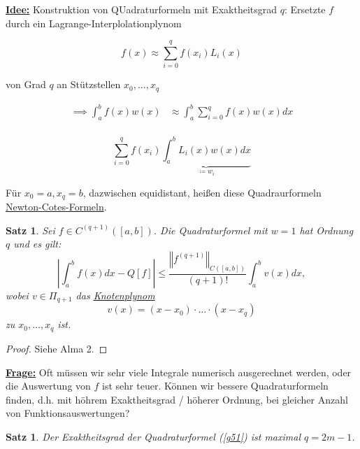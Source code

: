 \documentclass{book}
\newtheorem{theorem}[algorithm]{Satz}
\begin{document}
            \underline{\textbf{Idee:}} Konstruktion von QUadraturformeln mit Exaktheitsgrad $q$: Ersetzte $f$ durch ein
            Lagrange-Interplolationplynom

            \begin{equation*}
                f(x)\approx \sum_{i=0}^q f(x_i)L_i(x)
            \end{equation*}

            von Grad $q$ an Stützstellen $x_0,\dots,x_q$

            \begin{align*}
                \implies \int_a^b f(x)w(x)&\approx \int_a^b\sum_{i=0}^qf(x)w(x)dx\\
            \end{align*}

            \begin{equation}
                \sum_{i=0}^q f(x_i)\underbrace{\int_a^b L_i(x)w(x)dx}_{\coloneqq w_i}\label{g52}
            \end{equation}

            Für $x_0=a,x_q=b$, dazwischen equidistant, heißen diese Quadraurformeln \underline{{Newton-Cotes-Formeln}}.

            \begin{theorem}\label{s53}
                Sei $f\in C^{(q+1)}([a,b])$. Die Quadraturformel mit $w=1$ hat Ordnung $q$ und es gilt:
                \begin{equation*}
                    \left\vert \int_a^b f(x)dx-Q[f] \right\vert\leq \frac{\left\Vert f^{(q+1)} \right\Vert_{C([a,b])}}{(q+1)!}\int_a^b v(x)dx,
                \end{equation*}
                wobei $v\in\Pi_{q+1}$ das \underline{Knotenplynom}
                \[v(x)=(x-x_0)\cdot\dots\cdot (x-x_q)\]
                zu $x_0,\dots,x_q$ ist.
            \end{theorem}

            \begin{proof}
                Siehe Alma 2.
            \end{proof}

            \underline{\textbf{Frage:}} Oft müssen wir sehr viele Integrale numerisch ausgerechnet werden, oder 
            die Auswertung von $f$ ist sehr teuer. Können wir bessere Quadraturformeln finden, d.h. mit höhrem Exaktheitsgrad / höherer Ordnung,
            bei gleicher Anzahl von Funktionsauswertungen?

            \begin{theorem}\label{s54}
                Der Exaktheitsgrad der Quadraturformel (\ref{g51}) ist maximal $q=2m-1$.
            \end{theorem}
\end{document}

